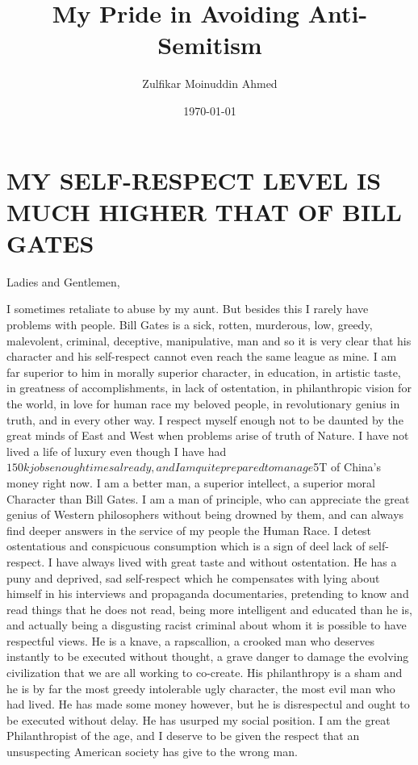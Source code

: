 \documentclass{amsart}
\title{My Pride in Avoiding Anti-Semitism}
\author{Zulfikar Moinuddin Ahmed}
\date{\today}
\begin{document}
\maketitle

\section{MY SELF-RESPECT LEVEL IS MUCH HIGHER THAT OF BILL GATES}


Ladies and Gentlemen,

I sometimes retaliate to abuse by my aunt.  But besides this I rarely have problems with people.  Bill Gates is a sick, rotten, murderous, low, greedy, malevolent, criminal, deceptive, manipulative, man and so it is very clear that his character and his self-respect cannot even reach the same league as mine.  I am far superior to him in morally superior character, in education, in artistic taste, in greatness of accomplishments, in lack of ostentation, in philanthropic vision for the world, in love for human race my beloved people, in revolutionary genius in truth, and in every other way.  I respect myself enough not to be daunted by the great minds of East and West when problems arise of truth of Nature.  I have not lived a life of luxury even though I have had $150k jobs enough times already, and I am quite prepared to manage $5T of China's money right now.  I am a better man, a superior intellect, a superior moral Character than Bill Gates. I am a man of principle, who can appreciate the great genius of Western philosophers without being drowned by them, and can always find deeper answers in the service of my people the Human Race.  I detest ostentatious and conspicuous consumption which is a sign of deel lack of self-respect.  I have always lived with great taste and without ostentation.  He has a puny and deprived, sad self-respect which he compensates with lying about himself in his interviews and propaganda documentaries, pretending to know and read things that he does not read, being more intelligent and educated than he is, and actually being a disgusting racist criminal about whom it is possible to have respectful views.  He is a knave, a rapscallion, a crooked man who deserves instantly to be executed without thought, a grave danger to damage the evolving civilization that we are all working to co-create.  His philanthropy is a sham and he is by far the most greedy intolerable ugly character, the most evil man who had lived.  He has made some money however, but he is disrespectul and ought to be executed without delay.   He has usurped my social position.  I am the great Philanthropist of the age, and I deserve to be given the respect that an unsuspecting American society has give to the wrong man.
\end{document}
